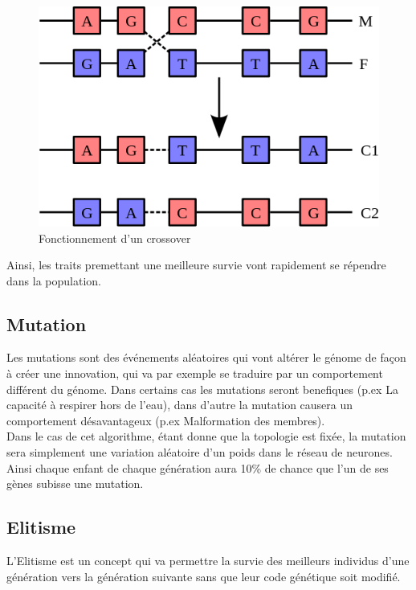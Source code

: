 \documentclass{article}
\begin{document}
\begin{figure}[h]
\begin{center}
	\includegraphics[scale=0.4]{"crossover.png"} 
	\caption{Fonctionnement d'un crossover}
\end{center}
\end{figure}
\newpage

Ainsi, les traits premettant une meilleure survie vont rapidement se répendre dans la population.

\subsection{Mutation}

Les mutations sont des événements aléatoires qui vont altérer le génome de façon à créer une innovation, qui va par exemple se traduire par un comportement différent du génome. Dans certains cas les mutations seront benefiques (p.ex La capacité à respirer hors de l'eau), dans d'autre la mutation causera un comportement désavantageux (p.ex Malformation des membres).\\

Dans le cas de cet algorithme, étant donne que la topologie est fixée, la mutation sera simplement une variation aléatoire d'un poids dans le réseau de neurones. Ainsi chaque enfant de chaque génération aura 10\% de chance que l'un de ses gènes subisse une mutation.

\subsection{Elitisme}

L'Elitisme est un concept qui va permettre la survie des meilleurs individus d'une génération vers la génération suivante sans que leur code génétique soit modifié.\\
\end{document}

